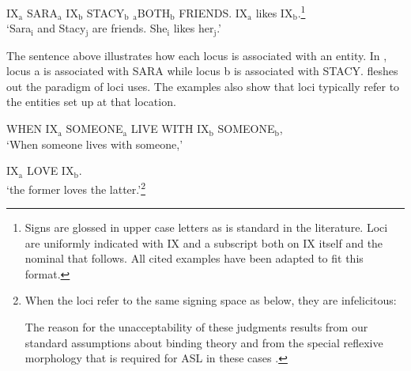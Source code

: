 \documentclass[output=paper,
modfonts
]{langscibook}
\begin{document}
\begin{exe}
\ex \label{ex:irani:1} 
IX$_\text{a}$ SARA$_\text{a}$ IX$_\text{b}$ STACY$_\text{b}$ $_\text{a}$BOTH$_\text{b}$ FRIENDS. IX$_\text{a}$ likes IX$_\text{b}$.\footnote{Signs are glossed in upper case letters as is standard in the literature. Loci are uniformly indicated with IX and a subscript both on IX itself and the nominal that follows. All cited examples have been adapted to fit this format.}\\
`Sara$_\text{i}$ and Stacy$_\text{j}$ are friends. She$_\text{i}$ likes her$_\text{j}$.'
\end{exe}

The sentence above illustrates how each locus is associated with an entity. In , locus a is associated with SARA while locus b is associated with STACY.  fleshes out the paradigm of loci uses. The examples also show that loci typically refer to the entities set up at that location.

\begin{exe}
\ex \label{ex:irani:2}
\begin{xlist}
	\ex  WHEN IX$_\text{a}$ SOMEONE$_\text{a}$ LIVE WITH IX$_\text{b}$ SOMEONE$_\text{b}$, \\
	`When someone lives with someone,’ 
	
	\ex IX$_\text{a}$ LOVE IX$_\text{b}$. \\
	`the former loves the latter.’\footnote{ When the loci refer to the same signing space as below, they are infelicitous:
		
		\begin{exe} 
			\begin{xlist}
			\end{xlist}
		\end{exe}
		
		The reason for the unacceptability of these judgments results from our standard assumptions about binding theory \citep{ReinhartReuland1993} and from the special reflexive morphology that is required for ASL in these cases \citep{Meir1998}.} \citep[adapted from][13]{Schlenker2010}
	
\end{xlist}
\end{exe}
\end{document}
